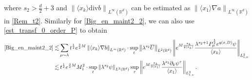 \documentclass[10pt,twoside,a4paper]{article}
\numberwithin{equation}{section}\allowdisplaybreaks
\begin{document}
where    $ s_2>\frac d2 +3 $ and $\left\|\langle x_k\rangle \mathrm{div}b  \right\|_{L^{\infty}(\mathbb{R}^d)} $ can be estimated as $\left\|\langle x_1\rangle \nabla a  \right\|_{L^{\infty}(\mathbb{R}^d)} $ in  \eqref{Rem_t2}.
 Similarly for	\eqref{Big_en_maint2_2}, we can also use \eqref{est_transf_0_order_P} to obtain
\begin{align*}
	\eqref{Big_en_maint2_2} \lesssim &\sum_{\mu\sim \lambda}  t^{\frac12} e^{\frac 32M}\left\|\langle x_k\rangle  \nabla b  \right\|_{L^{\infty}(\mathbb{R}^d)} \cdot \sup_{t }\left\| \lambda^{s_2}\overline{U}\right\|_{L^{2}(\mathbb{R}^d)}   \left\|e^{M \frac{x_k}{2\langle x_k\rangle} }  \frac{\lambda^{s_2+1}P_\mu^{\frac 12}  e^{q (x,D)} \psi}{\langle x_k\rangle }  \right\|_{L^2_{t,x}} \\
	\lesssim &\, t^{\frac12} e^{\frac 32M} M_1^2  \cdot \sup_{t }\left\| \lambda^{s_2} \psi\right\|_{L^{2}(\mathbb{R}^d)}  \sup_{\tau}   \left\| e^{M \frac{x_k}{2\langle x_1\rangle} }  \frac{\lambda^{s_2} \partial_k \psi^{\tau }}{\langle x_1\rangle } \right\|_{L^2_{t,x}}.
\end{align*}
\end{document}
